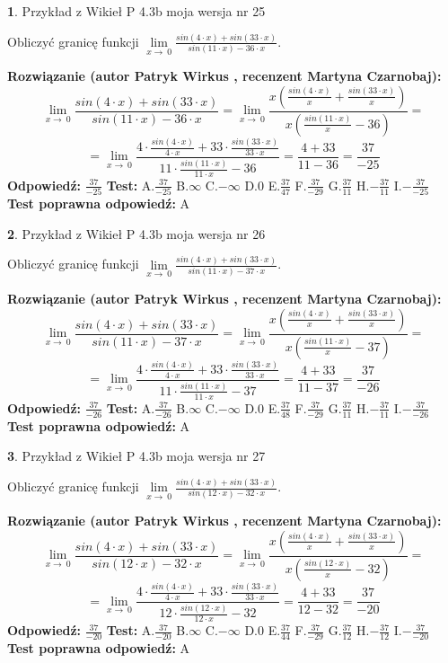\documentclass[12pt, a4paper]{article}
\theoremstyle{definition} %
\newtheorem{zad}{}
\newcommand{\zadStart}[1]{\begin{zad}#1\newline}
\newcommand{\zadStop}{\end{zad}}
\newcommand{\rozwStart}[2]{\noindent \textbf{Rozwiązanie (autor #1 , recenzent #2): }\newline}
\newcommand{\rozwStop}{\newline}
\newcommand{\odpStart}{\noindent \textbf{Odpowiedź:}\newline}
\newcommand{\odpStop}{\newline}
\newcommand{\testStart}{\noindent \textbf{Test:}\newline}
\newcommand{\testStop}{\newline}
\newcommand{\kluczStart}{\noindent \textbf{Test poprawna odpowiedź:}\newline}
\newcommand{\kluczStop}{\newline}
\begin{document}
\zadStart{Przykład z Wikieł P 4.3b moja wersja nr 25}


Obliczyć granicę funkcji $\lim\limits_{x\to\ 0}\frac{sin(4 \cdot x)+sin(33 \cdot x)}{sin(11 \cdot x)-36 \cdot x}$.
\zadStop
\rozwStart{Patryk Wirkus}{Martyna Czarnobaj}
$$\lim\limits_{x\to\ 0}\frac{sin(4 \cdot x)+sin(33 \cdot x)}{sin(11 \cdot x)-36 \cdot x}=\lim\limits_{x\to\ 0}\frac{x(\frac{sin(4 \cdot x)}{x}+\frac{sin(33 \cdot x)}{x})}{x(\frac{sin(11 \cdot x)}{x}-36)}=$$
$$=\lim\limits_{x\to\ 0}\frac{4 \cdot \frac{sin(4 \cdot x)}{4 \cdot x}+33 \cdot \frac{sin(33 \cdot x)}{33 \cdot x}}{11 \cdot \frac{sin(11 \cdot x)}{11 \cdot x}-36}=\frac{4+33}{11-36} = \frac{37}{-25}$$
\rozwStop
\odpStart
$\frac{37}{-25}$
\odpStop
\testStart
A.$\frac{37}{-25}$
B.$\infty$
C.$-\infty$
D.$0$
E.$\frac{37}{47}$
F.$\frac{37}{-29}$
G.$\frac{37}{11}$
H.$-\frac{37}{11}$
I.$-\frac{37}{-25}$
\testStop
\kluczStart
A
\kluczStop



\zadStart{Przykład z Wikieł P 4.3b moja wersja nr 26}


Obliczyć granicę funkcji $\lim\limits_{x\to\ 0}\frac{sin(4 \cdot x)+sin(33 \cdot x)}{sin(11 \cdot x)-37 \cdot x}$.
\zadStop
\rozwStart{Patryk Wirkus}{Martyna Czarnobaj}
$$\lim\limits_{x\to\ 0}\frac{sin(4 \cdot x)+sin(33 \cdot x)}{sin(11 \cdot x)-37 \cdot x}=\lim\limits_{x\to\ 0}\frac{x(\frac{sin(4 \cdot x)}{x}+\frac{sin(33 \cdot x)}{x})}{x(\frac{sin(11 \cdot x)}{x}-37)}=$$
$$=\lim\limits_{x\to\ 0}\frac{4 \cdot \frac{sin(4 \cdot x)}{4 \cdot x}+33 \cdot \frac{sin(33 \cdot x)}{33 \cdot x}}{11 \cdot \frac{sin(11 \cdot x)}{11 \cdot x}-37}=\frac{4+33}{11-37} = \frac{37}{-26}$$
\rozwStop
\odpStart
$\frac{37}{-26}$
\odpStop
\testStart
A.$\frac{37}{-26}$
B.$\infty$
C.$-\infty$
D.$0$
E.$\frac{37}{48}$
F.$\frac{37}{-29}$
G.$\frac{37}{11}$
H.$-\frac{37}{11}$
I.$-\frac{37}{-26}$
\testStop
\kluczStart
A
\kluczStop



\zadStart{Przykład z Wikieł P 4.3b moja wersja nr 27}


Obliczyć granicę funkcji $\lim\limits_{x\to\ 0}\frac{sin(4 \cdot x)+sin(33 \cdot x)}{sin(12 \cdot x)-32 \cdot x}$.
\zadStop
\rozwStart{Patryk Wirkus}{Martyna Czarnobaj}
$$\lim\limits_{x\to\ 0}\frac{sin(4 \cdot x)+sin(33 \cdot x)}{sin(12 \cdot x)-32 \cdot x}=\lim\limits_{x\to\ 0}\frac{x(\frac{sin(4 \cdot x)}{x}+\frac{sin(33 \cdot x)}{x})}{x(\frac{sin(12 \cdot x)}{x}-32)}=$$
$$=\lim\limits_{x\to\ 0}\frac{4 \cdot \frac{sin(4 \cdot x)}{4 \cdot x}+33 \cdot \frac{sin(33 \cdot x)}{33 \cdot x}}{12 \cdot \frac{sin(12 \cdot x)}{12 \cdot x}-32}=\frac{4+33}{12-32} = \frac{37}{-20}$$
\rozwStop
\odpStart
$\frac{37}{-20}$
\odpStop
\testStart
A.$\frac{37}{-20}$
B.$\infty$
C.$-\infty$
D.$0$
E.$\frac{37}{44}$
F.$\frac{37}{-29}$
G.$\frac{37}{12}$
H.$-\frac{37}{12}$
I.$-\frac{37}{-20}$
\testStop
\kluczStart
A
\kluczStop
\end{document}

